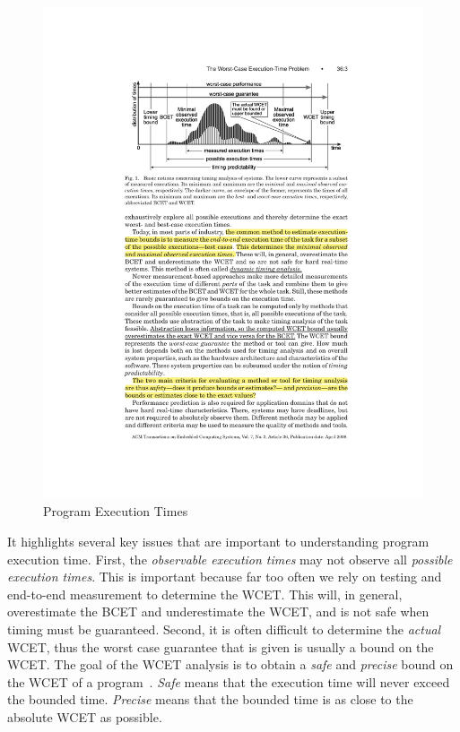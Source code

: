 \begin{figure}[h]
  \begin{center}
    \includegraphics{figs/program_executiontimes.pdf}
  \end{center}
  \vspace{-3mm}
  \caption{Program Execution Times~\cite{wilhelm-survey-paper}}
  \label{fig:program_execution_times}
\end{figure}

It highlights several key issues that are important to understanding program execution time.
First, the \emph{observable execution times} may not observe all \emph{possible execution times}.
This is important because far too often we rely on testing and end-to-end measurement to determine the WCET.
This will, in general, overestimate the BCET and underestimate the WCET, and is not safe when timing must be guaranteed. 
Second, it is often difficult to determine the \emph{actual} WCET, thus the worst case guarantee that is given is usually a bound on the WCET.    
The goal of the WCET analysis is to obtain a \textit{safe} and \textit{precise} bound on the WCET of a program~\cite{Wilhelm2008survey}. 
\textit{Safe} means that the execution time will never exceed the bounded time. 
\textit{Precise} means that the bounded time is as close to the absolute WCET as possible. 

